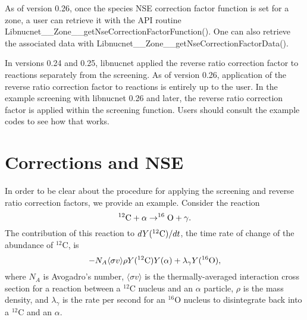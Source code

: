 \documentclass{article}    %
\begin{document}
As of version 0.26,
once the species NSE correction factor function is set for a zone,
a user can retrieve it with the API routine
Libnucnet\_\_Zone\_\_getNseCorrectionFactorFunction().  One can also
retrieve the associated data with
Libnucnet\_\_Zone\_\_getNseCorrectionFactorData().

In versions 0.24 and 0.25, libnucnet applied the reverse ratio
correction factor to reactions
separately from the screening.  As of version 0.26,
application of the reverse ratio correction factor to reactions
is entirely up to the
user.  In the example screening with libnucnet 0.26 and later, the
reverse ratio correction factor is applied within the screening function.
Users should consult the example codes to see how that works.

\section{Corrections and NSE}
In order to be clear about the procedure for applying the screening and
reverse ratio correction factors, we provide an example.  Consider the
reaction
\begin{equation}
^{12}{\rm C} + \alpha \to ^{16}{\rm O} + \gamma. \label{eq:reaction}
\end{equation}
The contribution of this reaction
to $dY({^{12}{\rm C}})/dt$, the time rate of change of the abundance
of $^{12}$C, 
is
\begin{equation}
-N_A \langle \sigma v \rangle \rho Y(^{12}{\rm C}) Y(\alpha ) + \lambda_\gamma
Y(^{16}{\rm O}),  \label{eq:diffeq}
\end{equation}
where $N_A$ is Avogadro's number, $\langle \sigma v \rangle$ is the
thermally-averaged interaction cross section for a reaction between 
a $^{12}$C nucleus and an $\alpha$ particle, $\rho$ is the mass density,
and $\lambda_\gamma$ is the rate per second for an $^{16}$O nucleus to
disintegrate back into a $^{12}$C and an $\alpha$.
\end{document}
